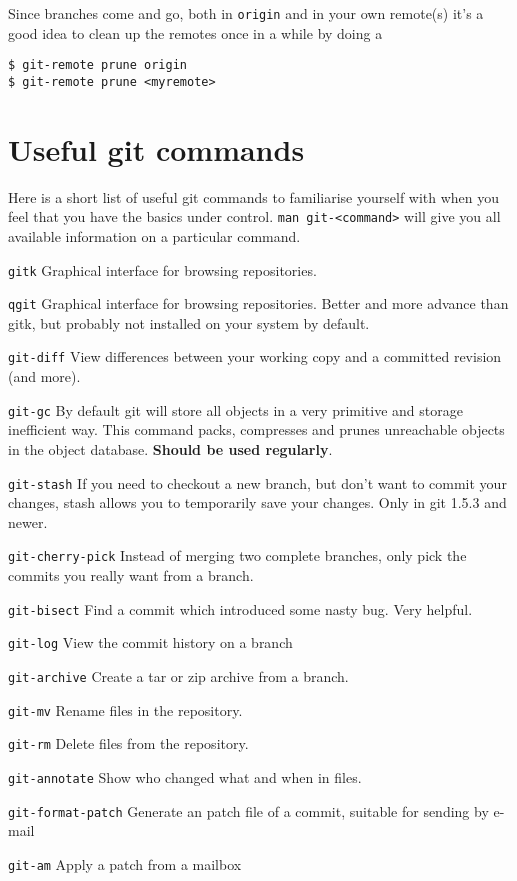 \documentclass[a4paper,10pt]{article}
\begin{document}
Since branches come and go, both in {\tt origin} and in your own remote(s)
it's a good idea to clean up the remotes once in a while by doing a
\begin{verbatim}
$ git-remote prune origin
$ git-remote prune <myremote>
\end{verbatim}

\section{Useful git commands}
Here is a short list of useful git commands to familiarise yourself with when
you feel that you have the basics under control. {\tt man git-<command>} will
give you all available information on a particular command.
\begin{description}
\item{\tt gitk} Graphical interface for browsing repositories.
\item{\tt qgit} Graphical interface for browsing repositories. Better and more
advance than gitk, but probably not installed on your system by default.
\item{\tt git-diff} View differences between your working copy and a committed
revision (and more).
\item{\tt git-gc} By default git will store all objects in a very primitive
and storage inefficient way. This command packs, compresses and prunes
unreachable objects in the object database. {\bf Should be used regularly}.
\item{\tt git-stash} If you need to checkout a new branch, but don't want to
commit your changes, stash allows you to temporarily save your changes. Only
in git 1.5.3 and newer.
\item{\tt git-cherry-pick} Instead of merging two complete branches, only pick the
commits you really want from a branch.
\item{\tt git-bisect} Find a commit which introduced some nasty bug. Very
helpful.
\item{\tt git-log} View the commit history on a branch
\item{\tt git-archive} Create a tar or zip archive from a branch.
\item{\tt git-mv} Rename files in the repository.
\item{\tt git-rm} Delete files from the repository.
\item{\tt git-annotate} Show who changed what and when in files.
\item{\tt git-format-patch} Generate an patch file of a commit, suitable for
sending by e-mail
\item{\tt git-am} Apply a patch from a mailbox

\end{description}
\end{document}
